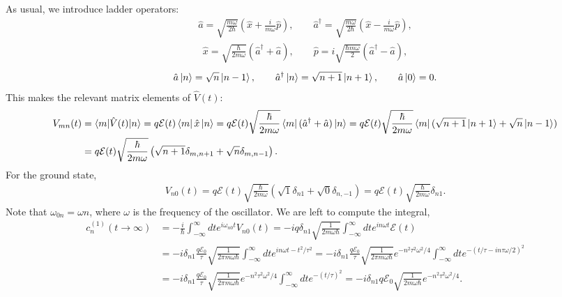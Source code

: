 \documentclass[10pt]{article}
\newcommand{\1}{\mathbf 1}
\begin{document}
As usual, we introduce ladder operators:
\begin{align}
	\hat a
	=
	\sqrt{\frac{m \omega}{2 \hbar}} ( \hat x + \frac{i}{m\omega}\hat p),
	\qquad
	\hat a^\dagger
	=
	\sqrt{\frac{m \omega}{2 \hbar}} ( \hat x - \frac{i}{m\omega}\hat p),
\end{align}
\begin{align}
	\hat x = \sqrt{
		\frac{\hbar}{2m \omega}
	}
	(\hat a^\dagger +\hat a),
	\qquad
	\hat p =i \sqrt{
		\frac{\hbar m \omega}{2}
	}
	(\hat a^\dagger - \hat a),
\end{align}
\begin{align}
	\hat a \ket{n} = \sqrt{n} \ket{n-1}
	,
	\qquad
	\hat a^\dagger \ket{n} = \sqrt{n+1}\ket{n+1},
	\qquad
	\hat a \ket{0} = 0.
\end{align}
This makes the relevant matrix elements of $\hat V(t)$:
\begin{align}
	V_{mn}(t)
	&=\nonumber
	\braket{m|\hat V(t)|n}
	=
	q \mathcal{E}(t)
	\bra{m}
	\hat x
	\ket{n}
	=
	q \mathcal{E}(t)
	\sqrt{\frac{\hbar}{2m\omega}}
	\bra{m}
	(\hat a^\dagger + \hat a)
	\ket{n}
	=
	q \mathcal{E}(t)
	\sqrt{\frac{\hbar}{2m\omega}}
	\bra{m}
	(\sqrt{n+1}\ket{n+1}+ \sqrt{n}\ket{n-1})
	\\
	&
	=
	q\mathcal{E}(t)
	\sqrt{\frac{\hbar}{2m\omega}}
	\left(
	\sqrt{n+1} \delta_{m,n+1}
	+
	\sqrt{n} \delta_{m,n-1}
	\right).
\end{align}
For the ground state,
\begin{align}
	V_{n0}(t)
	=
	q\mathcal{E}(t)
	\sqrt{\frac{\hbar}{2m\omega}}
	\left(
		\sqrt{1} \delta_{n1}
		+
		\sqrt{0} \delta_{n,-1}
	\right)
	=
	q\mathcal{E}(t)
	\sqrt{\frac{\hbar}{2m\omega}}
	\delta_{n1}.
\end{align}
Note that $\omega_{0n} = \omega n$, where $\omega$ is the frequency of the oscillator.
We are left to compute the integral,
\begin{align}
	c_n^{(1)}(t \to \infty)
	&=\nonumber
	-\frac{i}{\hbar}
	\int_{-\infty}^\infty
	dt
	e^{i\omega_{n0} t}
	V_{n0}(t)
	=
	-i q
	\delta_{n1}
	\sqrt{
		\frac{1}{2m\omega\hbar}
	}
	\int_{-\infty}^\infty
	dt
	e^{in\omega t}
	\mathcal{E}(t)
	\\
	&
	=
	-i
	\delta_{n1}
	\frac{q\mathcal{E}_0}{\tau}
	\sqrt{
		\frac{1}{2\pi m\omega\hbar}
	}
	\int_{-\infty}^\infty
	dt
	e^{in\omega t - t^2/\tau^2}
	=
	-i
	\delta_{n1}
	\frac{q\mathcal{E}_0}{\tau}
	\sqrt{
		\frac{1}{2\pi m\omega\hbar}
	}
	e^{-n^2 \tau^2\omega^2/4}
	\int_{-\infty}^\infty
	dt
	e^{-(t/\tau - i n \tau \omega/2)^2}
	\\
	&
	=
	-i
	\delta_{n1}
	\frac{q\mathcal{E}_0}{\tau}
	\sqrt{
		\frac{1}{2\pi m\omega\hbar}
	}
	e^{-n^2 \tau^2\omega^2/4}
	\int_{-\infty}^\infty
	dt
	e^{-(t/\tau)^2}
	=
	-i
	\delta_{n1}
	q
	\mathcal{E}_0
	\sqrt{
		\frac{1}{2 m\omega\hbar}
	}
	e^{-n^2 \tau^2\omega^2/4}.
\end{align}
\end{document}
